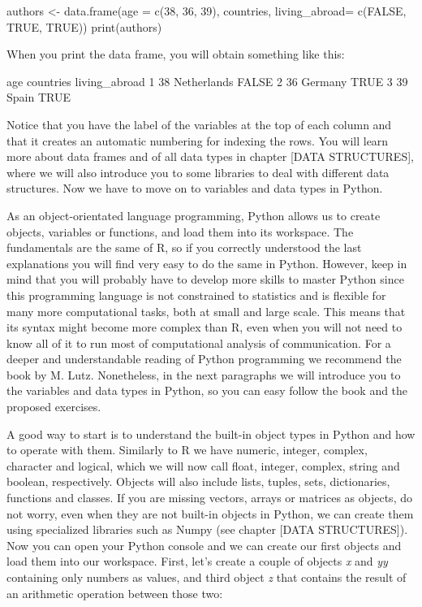 \begin{exampler}
authors <- data.frame(age = c(38, 36, 39), countries, living_abroad= c(FALSE, TRUE, TRUE))
print(authors)
\end{exampler}

When you print the data frame, you will obtain something like this:

\begin{exampler}
  	age   	countries 		living_abroad
1 	 38 	Netherlands         	FALSE
2 	 36 	Germany         	TRUE
3 	 39    	Spain          		TRUE
\end{exampler}

Notice that you have the label of the variables at the top of each column and that it creates an automatic numbering for indexing the rows.  You will learn more about data frames and of all data types in chapter [DATA STRUCTURES], where we will also introduce you to some libraries to deal with different data structures. Now we have to move on to variables and data types in Python.











As an object-orientated language programming, Python allows us to create objects, variables or functions, and load them into its workspace. The fundamentals are the same of R, so if you correctly understood the last explanations you will find very easy to do the same in Python. However, keep in mind that you will probably have to develop more skills to master Python since this programming language is not constrained to statistics and is flexible for many more computational tasks, both at small and large scale. This means that its syntax might become more complex than R, even when you will not need to know all of it to run most of computational analysis of communication.  For a deeper and understandable reading of Python programming we recommend the book by M. Lutz\cite{lutz2013learning}. Nonetheless, in the next paragraphs we will introduce you to the variables and data types in Python, so you can easy follow the book and the proposed exercises.  

A good way to start is to understand the built-in object types in Python and how to operate with them. Similarly to R we have numeric, integer, complex, character and logical, which we will now call float, integer, complex, string and boolean, respectively. Objects will also include lists, tuples, sets, dictionaries, functions and classes. If you are missing vectors, arrays or matrices as objects, do not worry, even when they are not built-in objects in Python, we can create them using specialized libraries such as Numpy (see chapter [DATA STRUCTURES]). Now you can open your Python console and we can create our first objects and load them into our workspace. First, let’s create a couple of objects \emph{x} and \emph{yy} containing only numbers as values, and third object \emph{z} that contains the result of an arithmetic operation between those two:








